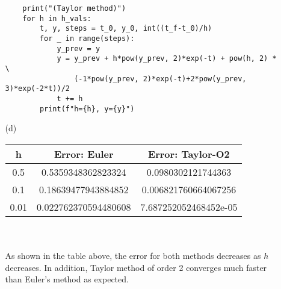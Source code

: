 \documentclass{article}
\begin{document}
\begin{itemize}
\begin{itemize}
\begin{verbatim}
    print("(Taylor method)")
    for h in h_vals:
        t, y, steps = t_0, y_0, int((t_f-t_0)/h)
        for _ in range(steps):
            y_prev = y
            y = y_prev + h*pow(y_prev, 2)*exp(-t) + pow(h, 2) * \
                (-1*pow(y_prev, 2)*exp(-t)+2*pow(y_prev, 3)*exp(-2*t))/2
            t += h
        print(f"h={h}, y={y}")
                    \end{verbatim}
              \item [(d)]
                    \begin{tabular}{|c|c|c|}
                        \hline
                        h    & Error: Euler         & Error: Taylor-O2      \\
                        \hline
                        0.5  & 0.5359348362823324   & 0.0980302121744363    \\
                        \hline
                        0.1  & 0.18639477943884852  & 0.006821760664067256  \\
                        \hline
                        0.01 & 0.022762370594480608 & 7.687252052468452e-05 \\
                        \hline
                    \end{tabular}\\\\
                    As shown in the table above, the error for both methods decreases as $h$ decreases. In addition, Taylor method of order 2 converges much faster than Euler's method as expected.
          \end{itemize}
\end{itemize}
\end{document}
